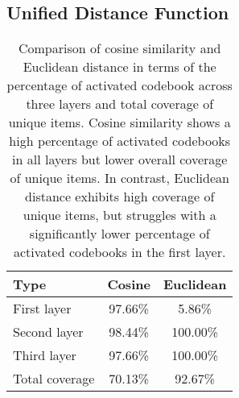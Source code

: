 


\subsection{Unified Distance Function}\label{sec:unified_distance}
\begin{table}[!htb]
\centering
\begin{tabular}{|l|c|c|}
\hline
\textbf{Type}         & \textbf{Cosine} & \textbf{Euclidean} \\ \hline
First layer           & 97.66\%         & 5.86\%             \\ \hline
Second layer          & 98.44\%         & 100.00\%           \\ \hline
Third layer           & 97.66\%         & 100.00\%           \\ \hline
Total coverage        & 70.13\%         & 92.67\%            \\ \hline
\end{tabular}

\caption{Comparison of cosine similarity and Euclidean distance in terms of the percentage of activated codebook across three layers and total coverage of unique items. Cosine similarity shows a high percentage of activated codebooks in all layers but lower overall coverage of unique items. In contrast, Euclidean distance exhibits high coverage of unique items, but struggles with a significantly lower percentage of activated codebooks in the first layer.}
\label{tab:distance}
\end{table}

